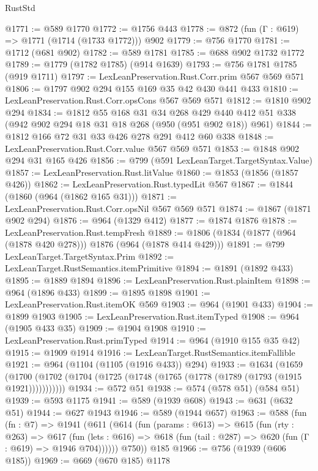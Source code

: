 \begin{lexlean}{RustStd}
\begin{coremodule}
@1771 := @589 @1770
@1772 := @1756 @443
@1778 := @872 (fun (Γ : @619) => @1771 (@1714 (@1733 @1772))) @902
@1779 := @756 @1770
@1781 := @1712 (@681 @902)
@1782 := @589 @1781
@1785 := @688 @902 @1732 @1772
@1789 := @1779 (@1782 @1785) (@914 @1639)
@1793 := @756 @1781 @1785 (@919 @1711)
@1797 := LexLeanPreservation.Rust.Corr.prim @567 @569 @571
@1806 := @1797 @902 @294 @155 @169 @35 @42 @430 @441 @433
@1810 := LexLeanPreservation.Rust.Corr.opsCons @567 @569 @571
@1812 := @1810 @902 @294
@1834 := @1812
    @55
    @168
    @31
    @34
    @268
    @429
    @440
    @412
    @51
    @338
    (@942 @902 @294 @18 @31 @18 @268 (@950 (@951 @902 @18)) @961)
@1844 := @1812 @166 @72 @31 @33 @426 @278 @291 @412 @60 @338
@1848 := LexLeanPreservation.Rust.Corr.value @567 @569 @571
@1853 := @1848 @902 @294 @31 @165 @426
@1856 := @799 (@591 LexLeanTarget.TargetSyntax.Value)
@1857 := LexLeanPreservation.Rust.litValue
@1860 := @1853 (@1856 (@1857 @426))
@1862 := LexLeanPreservation.Rust.typedLit @567
@1867 := @1844 (@1860 (@964 (@1862 @165 @31)))
@1871 := LexLeanPreservation.Rust.Corr.opsNil @567 @569 @571
@1874 := @1867 (@1871 @902 @294)
@1876 := @964 (@1329 @412)
@1877 := @1874 @1876
@1878 := LexLeanPreservation.Rust.tempFresh
@1889 := @1806 (@1834 (@1877 (@964 (@1878 @420 @278))) @1876 (@964 (@1878 @414 @429)))
@1891 := @799 LexLeanTarget.TargetSyntax.Prim
@1892 := LexLeanTarget.RustSemantics.itemPrimitive
@1894 := @1891 (@1892 @433)
@1895 := @1889 @1894
@1896 := LexLeanPreservation.Rust.plainItem
@1898 := @964 (@1896 @433)
@1899 := @1895 @1898
@1901 := LexLeanPreservation.Rust.itemOK @569
@1903 := @964 (@1901 @433)
@1904 := @1899 @1903
@1905 := LexLeanPreservation.Rust.itemTyped
@1908 := @964 (@1905 @433 @35)
@1909 := @1904 @1908
@1910 := LexLeanPreservation.Rust.primTyped
@1914 := @964 (@1910 @155 @35 @42)
@1915 := @1909 @1914
@1916 := LexLeanTarget.RustSemantics.itemFallible
@1921 := @964 (@1104 (@1105 (@1916 @433)) @294)
@1933 := @1634
    (@1659 (@1700 (@1702 (@1704 (@1725 (@1748 (@1765 (@1778 (@1789 (@1793 (@1915 @1921)))))))))))
@1934 := @572 @51
@1938 := @574 (@578 @51) (@584 @51)
@1939 := @593 @1175
@1941 := @589 (@1939 @608)
@1943 := @631 (@632 @51)
@1944 := @627 @1943
@1946 := @589 (@1944 @657)
@1963 := @588
    (fun (fn : @7) =>
    @1941
      (@611
        (@614
          (fun (params : @613) =>
          @615
            (fun (rty : @263) =>
            @617
              (fun (lets : @616) =>
              @618 (fun (tail : @287) => @620 (fun (Γ : @619) => @1946 @704))))))
        @750))
    @185
@1966 := @756 (@1939 (@606 @185))
@1969 := @669 (@670 @185) @1178

\end{coremodule}
\end{lexlean}
